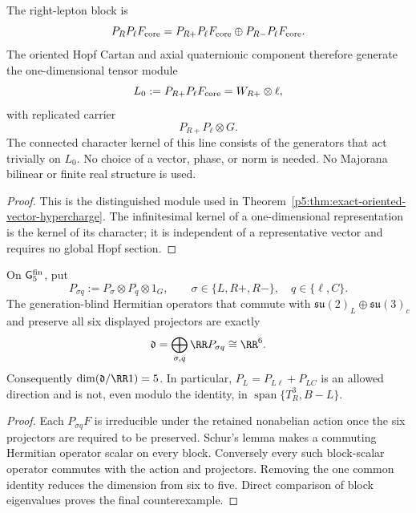 \documentclass[12pt,a4paper]{article}
\begin{document}
\begin{corollary}
\label{p5:cor:supplied-self-conjugate-line-neutrality}
\label{p5:lem:geometric-majorana-line}
The right-lepton block is
\begin{equation}
\label{p5:eq:local-fixed-right-lepton-block}
P_RP_\ell F_{\rm core}=P_{R+}P_\ell F_{\rm core}\oplus P_{R-}P_\ell F_{\rm core}.
\end{equation}
The oriented Hopf Cartan and axial quaternionic component therefore generate
the one-dimensional tensor module
\begin{equation}
\label{p5:eq:r0-local-fixed-line}
L_0:=P_{R+}P_\ell F_{\rm core}=W_{R+}\otimes\ell,
\end{equation}
with replicated carrier
\begin{equation}
\label{p5:eq:r0-family-support}
P_{R+}P_\ell\otimes G.
\end{equation}
The connected character kernel of this line consists of the generators that
act trivially on \(L_0\).  No choice of a vector, phase, or norm is needed.  No
Majorana bilinear or finite real structure is used.
\end{corollary}

\begin{proof}
This is the distinguished module used in
Theorem~\ref{p5:thm:exact-oriented-vector-hypercharge}.  The infinitesimal
kernel of a one-dimensional representation is the kernel of its character;
it is independent of a representative vector and requires no global Hopf
section.
\end{proof}

\begin{lemma}
\label{p5:lem:full-diagonal-centralizer}
\label{p5:lem:one-abelian-slot-derived}
On \(\mathsf G_5^{\rm fin}\), put
\[
P_{\sigma q}:=P_\sigma\otimes P_q\otimes1_G,
\qquad
\sigma\in\{L,R+,R-\},\quad q\in\{\ell,C\}.
\]
The generation-blind Hermitian operators that commute with
\(\mathfrak{su}(2)_L\oplus\mathfrak{su}(3)_c\) and preserve all six displayed
projectors are exactly
\[
\mathfrak d
=
\bigoplus_{\sigma,q}\RR P_{\sigma q}
\cong\RR^6.
\]
Consequently \(\dim(\mathfrak d/\RR1)=5\).  In particular,
\(P_L=P_{L\ell}+P_{LC}\) is an allowed direction and is not, even modulo the
identity, in \(\operatorname{span}\{T_R^3,B-L\}\).
\end{lemma}

\begin{proof}
Each \(P_{\sigma q}F\) is irreducible under the retained nonabelian action
once the six projectors are required to be preserved.  Schur's lemma makes a
commuting Hermitian operator scalar on every block.  Conversely every such
block-scalar operator commutes with the action and projectors.  Removing the
one common identity reduces the dimension from six to five.  Direct
comparison of block eigenvalues proves the final counterexample.
\end{proof}
\end{document}
